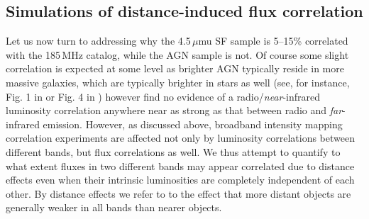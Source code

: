 \documentclass{emulateapj}
\begin{document}
\subsection{Simulations of distance-induced flux correlation}

Let us now turn to addressing why the 4.5\,$\mu$mu SF sample is 5--15\% correlated with the 185\,MHz catalog, while the AGN sample is not. Of course some slight correlation is expected at some level as brighter AGN typically reside in more massive galaxies, which are typically brighter in stars as well (see, for instance, Fig. 1 in \citep{seymour07} or Fig. 4 in \citep{Willott03}) however \citet{mauch07} find no evidence of a radio/\textit{near}-infrared luminosity correlation anywhere near as strong as that between radio and \textit{far}-infrared emission.  However, as discussed above, broadband intensity mapping correlation experiments are affected not only by luminosity correlations between different bands, but flux correlations as well. We thus attempt to quantify to what extent fluxes in two different bands may appear correlated due to distance effects even when their intrinsic luminosities are completely independent of each other. By distance effects we refer to to the effect that more distant objects are generally weaker in all bands than nearer objects. 
\end{document}
